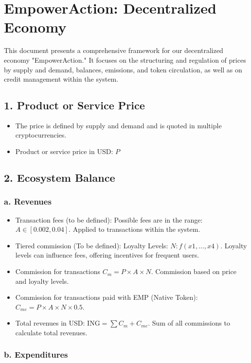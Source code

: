\documentclass{article}
\begin{document}
\section*{EmpowerAction: Decentralized Economy}

This document presents a comprehensive framework for our decentralized economy "EmpowerAction."
It focuses on the structuring and regulation of prices by supply and demand, balances, emissions, and token circulation, as well as on credit management within the system.

\subsection*{1. Product or Service Price}
\begin{itemize}
    \item The price is defined by supply and demand and is quoted in multiple cryptocurrencies.
    \item Product or service price in USD: \( P \)
\end{itemize}
\subsection*{2. Ecosystem Balance}
\subsubsection*{a. Revenues}
\begin{itemize}
    \item Transaction fees (to be defined): Possible fees are in the range: \( A \in [0.002, 0.04] \). Applied to transactions within the system.
    \item Tiered commission (To be defined): Loyalty Levels: \( N: f(x1,\ldots,x4) \). Loyalty levels can influence fees, offering incentives for frequent users.
    \item Commission for transactions \( C_m = P \times A \times N \). Commission based on price and loyalty levels.
    \item Commission for transactions paid with EMP (Native Token): \( C_{me} = P \times A \times N \times 0.5 \).
    \item Total revenues in USD: \( \text{ING} = \sum C_m + C_{me} \). Sum of all commissions to calculate total revenues.
\end{itemize}
\subsubsection*{b. Expenditures}
\end{document}
